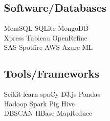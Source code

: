 \documentclass[]{deedy-resume-openfont}
\begin{document}
\begin{minipage}[t]{0.31\textwidth}
\subsection{Software/Databases}
\textbullet{} MemSQL \textbullet{} SQLite \textbullet{} MongoDB  \\
\textbullet{} Xpress \textbullet{} Tableau \textbullet{} OpenRefine \\
\textbullet{} SAS \textbullet{} Spotfire \textbullet{} AWS \textbullet{} Azure ML
\sectionsep

\subsection{Tools/Frameworks}
\textbullet{} Scikit-learn \textbullet{} spaCy \textbullet{} D3.js \textbullet{} Pandas \\
\textbullet{} Hadoop \textbullet{} Spark \textbullet{} Pig \textbullet{} Hive \\ 
\textbullet{} DBSCAN \textbullet{} HBase \textbullet{} MapReduce
\sectionsep

%
%

\end{minipage} 
\hfill
\end{document}
